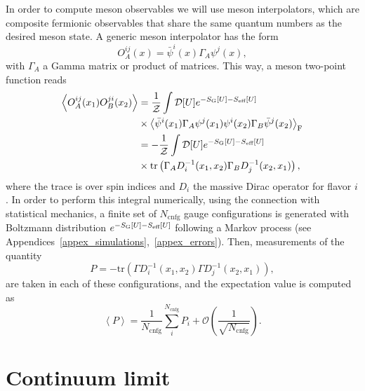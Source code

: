 In order to compute meson observables we will use meson interpolators, which are composite fermionic observables that share the same quantum numbers as the desired meson state. A generic meson interpolator has the form
\begin{equation}
{O}_A^{ij}(x)=\bar{\psi}^i(x)\Gamma_A\psi^j(x),
\end{equation}	
with $\Gamma_A$ a Gamma matrix or product of matrices. This way, a meson two-point function reads
\begin{align}
\label{ch_foundation:eq:path_int}
\left<{O}_A^{ij}(x_1){O}_B^{ji}(x_2)\right>&=\frac{1}{\mathcal{Z}}\int\mathcal{D}[U]e^{-S_{\textrm G}[U]-S_{\textrm{eff}}[U]}\notag\\
&\times\left<\bar{\psi}^i(x_1)\Gamma_A\psi^j(x_1)\psi^i(x_2)\Gamma_B\bar{\psi}^j(x_2)\right>_{\textrm F}  \\
&=-\frac{1}{\mathcal{Z}}\int\mathcal{D}[U]e^{-S_{\textrm G}[U]-S_{\textrm{eff}}[U]}\notag\\
&\times{\textrm{tr}}\left(\Gamma_AD_i^{-1}(x_1,x_2)\Gamma_BD_j^{-1}(x_2,x_1)\right),
\end{align}
where the trace is over spin indices and $D_i$ the massive Dirac operator for flavor $i$. In order to perform this integral numerically, using the connection with statistical mechanics, a finite set of $N_{\textrm{cnfg}}$ gauge configurations is generated with Boltzmann distribution $e^{-S_{\textrm G}[U]-S_{\textrm{eff}}[U]}$ following a Markov process (see Appendices~\ref{appex_simulations},~\ref{appex_errors}). Then, measurements of the quantity
\begin{equation}
P=-{\textrm{tr}}\left(\Gamma D_i^{-1}(x_1,x_2)\Gamma D_j^{-1}(x_2,x_1)\right),
\end{equation}
are taken in each of these configurations, and the expectation value is computed as
\begin{equation}
\left<P\right>=\frac{1}{N_{\textrm{cnfg}}}\sum_{i}^{N_{\textrm{cnfg}}}P_i+\mathcal{O}\left(\frac{1}{\sqrt{N_{\textrm{cnfg}}}}\right).
\end{equation}



\section{Continuum limit}
\label{ch_foundation:sec:continuum-limit}

